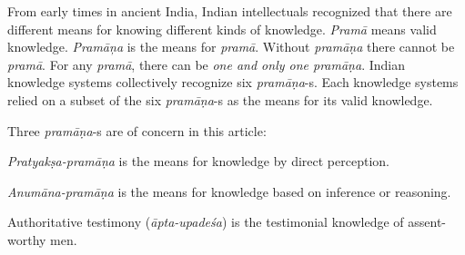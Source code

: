 From early times in ancient India, Indian intellectuals recognized that there are different means for knowing different kinds of knowledge. {\sl Pramā} means valid knowledge.  {\sl Pramāņa} is the means for {\sl pramā}.  Without {\sl pramāṇa} there cannot be {\sl pramā}.  For any {\sl pramā}, there can be {\sl one and only one pramāṇa}.  Indian knowledge systems collectively recognize six {\sl pramāṇa}-s. Each knowledge systems relied on a subset of the six {\sl pramāṇa}-s as the means for its valid knowledge.

Three {\sl pramāṇa}-s are of concern in this article:
\begin{myquote}
{\sl Pratyakṣa-pramāṇa} is the means for knowledge by direct perception. 

{\sl Anumāna-pramāṇa} is the means for knowledge based on inference or reasoning.  

Authoritative testimony ({\sl āpta-upadeśa}) is the testimonial knowledge of assent-worthy men.
\end{myquote}

